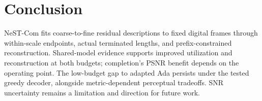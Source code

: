\section{Conclusion}
NeST-Com fits coarse-to-fine residual descriptions to fixed digital frames through within-scale endpoints, actual terminated lengths, and prefix-constrained reconstruction. Shared-model evidence supports improved utilization and reconstruction at both budgets; completion's PSNR benefit depends on the operating point. The low-budget gap to adapted Ada persists under the tested greedy decoder, alongside metric-dependent perceptual tradeoffs. SNR uncertainty remains a limitation and direction for future work.

